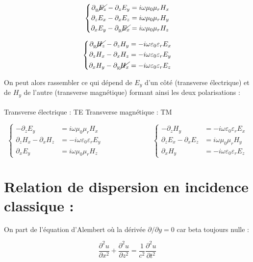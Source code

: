 \documentclass{article}
\begin{document}
\[
\left\{
\begin{aligned}
\partial_y \cancel{E_z} - \partial_z E_y &= i \omega \mu_0 \mu_r H_x \\
\partial_z E_x - \partial_x E_z &= i \omega \mu_0 \mu_r H_y \\
\partial_x E_y - \partial_y \cancel{E_x} &= i \omega \mu_0 \mu_r H_z
\end{aligned}
\right.
\]

\[
\left\{
\begin{aligned}
\partial_y \cancel{H_z} - \partial_z H_y &= -i \omega \varepsilon_0 \varepsilon_r E_x \\
\partial_z H_x - \partial_x H_z &= -i \omega \varepsilon_0 \varepsilon_r E_y \\
\partial_x H_y - \partial_y \cancel{H_x} &= -i \omega \varepsilon_0 \varepsilon_r E_z
\end{aligned}
\right.
\]

On peut alors rassembler ce qui dépend de \(E_y\) d'un côté (transverse électrique) et de \(H_y\) de l'autre (transverse magnétique) formant ainsi les deux polarisations : 
\\ \\
{Transverse électrique : TE} \hfill {Transverse magnétique : TM}

\[
\left\{
\begin{aligned}
-\partial_z E_y &= i\omega \mu_0 \mu_r H_x \\
\partial_z H_x - \partial_x H_z &= -i\omega \varepsilon_0 \varepsilon_r E_y \\
\partial_x E_y &= i\omega \mu_0 \mu_r H_z
\end{aligned}
\right.
\hspace{3cm}
\left\{
\begin{aligned}
-\partial_z H_y &= -i\omega \varepsilon_0 \varepsilon_r E_x \\
\partial_z E_x - \partial_x E_z &= i\omega \mu_0 \mu_r H_y \\
\partial_x H_y &= -i\omega \varepsilon_0 \varepsilon_r E_z
\end{aligned}
\right.
\]

\section*{Relation de dispersion en incidence classique :}

On part de l'équation d’Alembert où la dérivée \( \partial / \partial y = 0 \) car beta toujours nulle :

\[
\frac{\partial^2 u}{\partial x^2} + \frac{\partial^2 u}{\partial z^2} = \frac{1}{c^2} \frac{\partial^2 u}{\partial t^2}
\]
\end{document}
